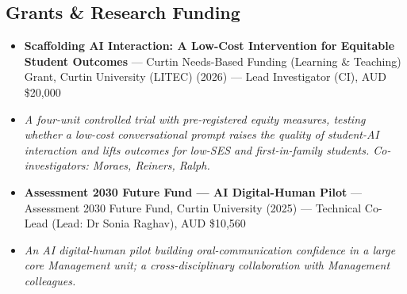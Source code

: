 \documentclass[11pt,a4paper]{article}
\begin{document}
\subsection*{Grants \& Research Funding}
\begin{itemize}
\item \textbf{Scaffolding AI Interaction: A Low-Cost Intervention for Equitable Student Outcomes} — Curtin Needs-Based Funding (Learning \& Teaching) Grant, Curtin University (LITEC) (2026) — Lead Investigator (CI), AUD \$20,000
\item[] \textit{A four-unit controlled trial with pre-registered equity measures, testing whether a low-cost conversational prompt raises the quality of student-AI interaction and lifts outcomes for low-SES and first-in-family students. Co-investigators: Moraes, Reiners, Ralph.}
\item \textbf{Assessment 2030 Future Fund — AI Digital-Human Pilot} — Assessment 2030 Future Fund, Curtin University (2025) — Technical Co-Lead (Lead: Dr Sonia Raghav), AUD \$10,560
\item[] \textit{An AI digital-human pilot building oral-communication confidence in a large core Management unit; a cross-disciplinary collaboration with Management colleagues.}
\end{itemize}
\end{document}
